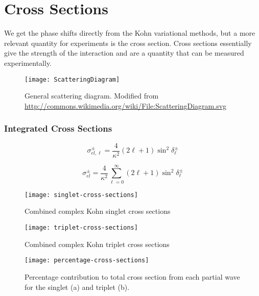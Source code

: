 \documentclass[Dissertation.tex]{subfiles}
\begin{document}
\clearpage
\pagebreak
\newpage

\chapter{Cross Sections}
\label{chp:CrossSections}


We get the phase shifts directly from the Kohn variational methods, but a more relevant quantity for experiments is the cross section. Cross sections essentially give the strength of the interaction and are a quantity that can be measured experimentally.

\begin{figure}[H]
	\centering
	\texttt{[image: ScatteringDiagram]}
	\caption[General scattering diagram]{General scattering diagram. Modified from \url{http://commons.wikimedia.org/wiki/File:ScatteringDiagram.svg}}
	\label{fig:ScatteringDiagram}
\end{figure}

\subsection{Integrated Cross Sections}
\label{sec:totalcross}

\begin{equation}
\label{eq:PartialCross}
\sigma_{el,\ell}^\pm = \frac{4}{\kappa^2} (2\ell+1) \sin^2 \delta_\ell^\pm
\end{equation}

\begin{equation}
\label{eq:TotalCross}
\sigma_{el}^\pm = \frac{4}{\kappa^2} \sum_{\ell=0}^\infty (2\ell+1) \sin^2 \delta_\ell^\pm
\end{equation}

\begin{figure}[H]
	\centering
	\texttt{[image: singlet-cross-sections]}
	\caption{Combined complex Kohn singlet cross sections}
	\label{fig:singlet-cross-sections}
\end{figure}

\begin{figure}[H]
	\centering
	\texttt{[image: triplet-cross-sections]}
	\caption{Combined complex Kohn triplet cross sections}
	\label{fig:triplet-cross-sections}
\end{figure}

\begin{figure}[H]
	\centering
	\texttt{[image: percentage-cross-sections]}
	\caption[Percentage contribution to total cross section]{Percentage contribution to total cross section from each partial wave for the singlet (a) and triplet (b).}
	\label{fig:percentage-cross-sections}
\end{figure}
\end{document}
